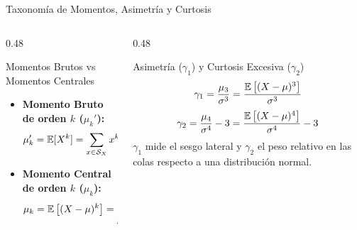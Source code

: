 \documentclass[10pt, aspectratio=169]{beamer}
\begin{document}
\begin{frame}{Taxonomía de Momentos, Asimetría y Curtosis}
  \begin{columns}[T]
    \begin{column}{0.48\textwidth}
      \begin{block}{Momentos Brutos vs Momentos Centrales}
        \footnotesize
        \begin{itemize}\itemsep=0.1cm
          \item \textbf{Momento Bruto de orden $k$ ($\mu_k'$):}
          $$\mu_k' = \mathbb{E}[X^k] = \sum_{x \in \mathcal{S}_X} x^k f_X(x)$$
          \item \textbf{Momento Central de orden $k$ ($\mu_k$):}
          $$\mu_k = \mathbb{E}\left[(X - \mu)^k\right] = \sum_{x \in \mathcal{S}_X} (x - \mu)^k f_X(x)$$
        \end{itemize}
      \end{block}
    \end{column}
    \begin{column}{0.48\textwidth}
      \pause
      \begin{alertblock}{Asimetría ($\gamma_1$) y Curtosis Excesiva ($\gamma_2$)}
        \footnotesize
        $$\gamma_1 = \dfrac{\mu_3}{\sigma^3} = \dfrac{\mathbb{E}\left[(X-\mu)^3\right]}{\sigma^3}$$
        $$\gamma_2 = \dfrac{\mu_4}{\sigma^4} - 3 = \dfrac{\mathbb{E}\left[(X-\mu)^4\right]}{\sigma^4} - 3$$
        $\gamma_1$ mide el sesgo lateral y $\gamma_2$ el peso relativo en las colas respecto a una distribución normal.
      \end{alertblock}
    \end{column}
  \end{columns}
\end{frame}
\end{document}
